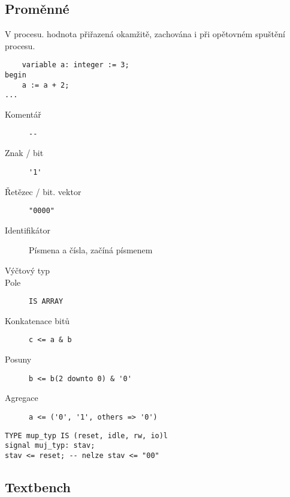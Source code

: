 \documentclass[a4wide]{report}
\begin{document}
\subsection{Proměnné}

V procesu. hodnota přiřazená okamžitě, zachována i při opětovném spuštění procesu.

\begin{lstlisting}
	variable a: integer := 3;
begin
	a := a + 2;
...
\end{lstlisting}

\begin{description}
	\item[Komentář] \verb|--|
	\item[Znak / bit] \verb|'1'|
	\item[Řetězec / bit. vektor] \verb|"0000"|
	\item[Identifikátor] Písmena a čísla, začíná písmenem
	\item[Výčtový typ]
	\item[Pole] \verb|IS ARRAY|
	\item[Konkatenace bitů] \verb|c <= a & b|
	\item[Posuny] \verb|b <= b(2 downto 0) & '0'|
	\item[Agregace] \verb|a <= ('0', '1', others => '0')|
\end{description}

\begin{lstlisting}
TYPE mup_typ IS (reset, idle, rw, io)l
signal muj_typ: stav;
stav <= reset; -- nelze stav <= "00"
\end{lstlisting}

\subsection{Textbench}




























\setcounter{chapter}{15}
\end{document}
